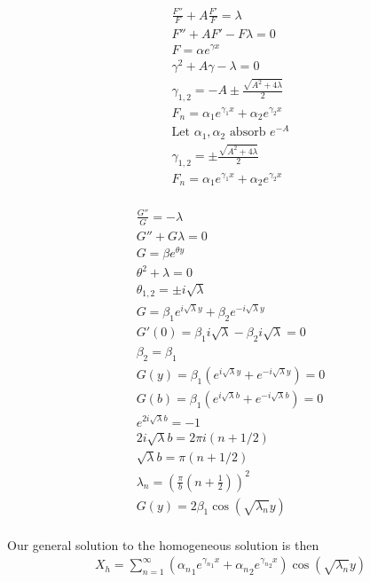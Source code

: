 \documentclass[11pt]{article}
\begin{document}
\noindent\begin{minipage}[b]{.5\linewidth}\centering
\begin{equation}\begin{aligned}
\frac{F''}{F} + A \frac{F'}{F} = \lambda \\
F'' + A F' - F \lambda = 0 \\
F = \alpha e^{\gamma x} \\
\gamma^2 + A \gamma - \lambda = 0 \\
\gamma_{1,2} = -A \pm \frac{\sqrt{A^2 + 4\lambda}}{2} \\
F_n = \alpha_1 e^{\gamma_1 x} + \alpha_2 e^{\gamma_2 x} \\
\text{Let $\alpha_1,\alpha_2$ absorb $e^{-A}$} \\
\gamma_{1,2} = \pm \frac{\sqrt{A^2 + 4\lambda}}{2} \\
F_n = \alpha_1 e^{\gamma_1 x} + \alpha_2 e^{\gamma_2 x} \\
\end{aligned} \end{equation}
\end{minipage}
\noindent\begin{minipage}[b]{.5\linewidth}\centering
\begin{equation}\begin{aligned}
\frac{G''}{G} = - \lambda \\
G'' + G \lambda = 0 \\
G = \beta e^{\theta y} \\
\theta^2 + \lambda = 0 \\
\theta_{1,2} = \pm i \sqrt{\lambda} \\
G = \beta_1 e^{i \sqrt{\lambda} y} + \beta_2 e^{-i \sqrt{\lambda} y} \\
G'(0) = \beta_1 i \sqrt{\lambda} - \beta_2 i \sqrt{\lambda} = 0 \\
\beta_2 = \beta_1 \\
G(y) = \beta_1 (e^{ i \sqrt{\lambda} y} + e^{-i \sqrt{\lambda} y}) = 0 \\
G(b) = \beta_1 (e^{ i \sqrt{\lambda} b} + e^{-i \sqrt{\lambda} b}) = 0 \\
                e^{2i \sqrt{\lambda} b} = -1 \\
2i \sqrt{\lambda} b = 2 \pi i (n+1/2) \\
   \sqrt{\lambda} b =   \pi   (n+1/2) \\
         \lambda_n  = \left(\frac{\pi}{b} \left( n+\frac{1}{2} \right) \right)^2 \\
G(y) = 2 \beta_1 \cos(\sqrt{\lambda_n} y) \\
\end{aligned} \end{equation}
\end{minipage}
Our general solution to the homogeneous solution is then
\begin{equation}\begin{aligned}
X_h = \sum_{n=1}^{\infty} \left( {\alpha_n}_1 e^{{\gamma_n}_1 x} + {\alpha_n}_2 e^{{\gamma_n}_2 x} \right) \cos(\sqrt{\lambda_n} y) \\
\end{aligned} \end{equation}
\end{document}
